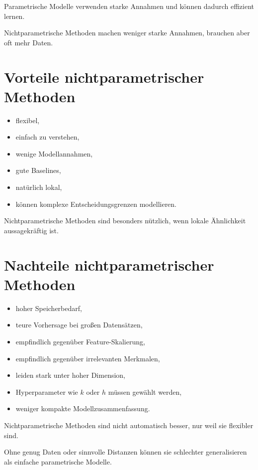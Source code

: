 \begin{conceptbox}
Parametrische Modelle verwenden starke Annahmen und können dadurch effizient lernen.

Nichtparametrische Methoden machen weniger starke Annahmen, brauchen aber oft mehr Daten.
\end{conceptbox}

\section{Vorteile nichtparametrischer Methoden}

\begin{itemize}
    \item flexibel,
    \item einfach zu verstehen,
    \item wenige Modellannahmen,
    \item gute Baselines,
    \item natürlich lokal,
    \item können komplexe Entscheidungsgrenzen modellieren.
\end{itemize}

\begin{conceptbox}
Nichtparametrische Methoden sind besonders nützlich, wenn lokale Ähnlichkeit aussagekräftig ist.
\end{conceptbox}

\section{Nachteile nichtparametrischer Methoden}

\begin{itemize}
    \item hoher Speicherbedarf,
    \item teure Vorhersage bei großen Datensätzen,
    \item empfindlich gegenüber Feature-Skalierung,
    \item empfindlich gegenüber irrelevanten Merkmalen,
    \item leiden stark unter hoher Dimension,
    \item Hyperparameter wie \(k\) oder \(h\) müssen gewählt werden,
    \item weniger kompakte Modellzusammenfassung.
\end{itemize}

\begin{notebox}
Nichtparametrische Methoden sind nicht automatisch besser, nur weil sie flexibler sind.

Ohne genug Daten oder sinnvolle Distanzen können sie schlechter generalisieren als einfache parametrische Modelle.
\end{notebox}

